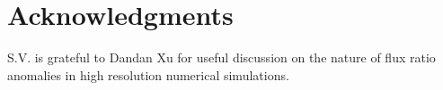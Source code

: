 \documentclass[useAMS,usenatbib]{mn2e}
\begin{document}

\section*{Acknowledgments}
S.V. is grateful to Dandan Xu for useful discussion on the nature of flux ratio anomalies in high resolution numerical simulations.






\label{lastpage}
\end{document}
